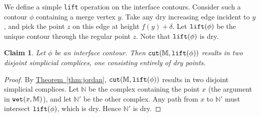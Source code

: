 \documentclass[11pt]{article}
\newtheorem{claim}[theorem]{Claim}
\theoremstyle{definition}
\newcommand{\MM}{\mathbb{M}}
\newcommand{\NN}{\mathbb{N}}
\newcommand{\Thm}[1]{\hyperref[thm:#1]{Theorem~\ref*{thm:#1}}} %
\newcommand{\cut}{{\tt cut}}
\newcommand{\lift}{{\tt lift}}
\newcommand{\wet}{{\tt wet}}
\begin{document}
% 
% 

We define a simple \lift{} operation on the interface contours. Consider such a contour $\phi$ containing
a merge vertex $y$. Take any dry increasing edge incident to $y$, and pick the point $z$ on this edge at height
$f(y) + \delta$. Let $\lift(\phi)$ be the unique contour through the regular point $z$. Note that $\lift(\phi)$ is dry.

\begin{claim} \label{clm:cut-int} Let $\phi$ be an interface contour. Then $\cut(\MM,\lift(\phi))$
results in two disjoint simplicial complices, one consisting entirely of dry points.
\end{claim}

\begin{proof} By \Thm{jordan}, $\cut(\MM,\lift(\phi))$ results in two disjoint simplicial complices. Let $\NN$ be the complex containing
the point $x$ (the argument in $\wet(x,\MM)$), and let $\NN'$ be the other complex. 
Any path from $x$ to $\NN'$ must intersect $\lift(\phi)$, which is dry. Hence $\NN'$ is dry.
%
%
\end{proof}
\end{document}
